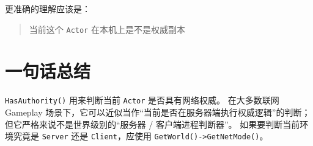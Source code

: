 更准确的理解应该是：

\begin{quote}
	当前这个 \texttt{Actor} 在本机上是不是权威副本
\end{quote}

\section{一句话总结}

\texttt{HasAuthority()} 用来判断当前 \texttt{Actor} 是否具有网络权威。  
在大多数联网 Gameplay 场景下，它可以近似当作“当前是否在服务器端执行权威逻辑”的判断；  
但它严格来说不是世界级别的“服务器 / 客户端进程判断器”。  
如果要判断当前环境究竟是 \texttt{Server} 还是 \texttt{Client}，应使用 \texttt{GetWorld()->GetNetMode()}。
